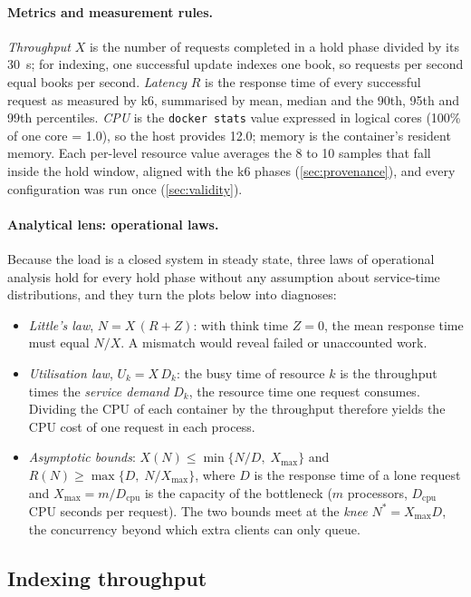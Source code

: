 \documentclass[10pt,a4paper]{article}
\newcommand{\code}[1]{\texttt{#1}}
\begin{document}
\paragraph{Metrics and measurement rules.}
\emph{Throughput} $X$ is the number of requests completed in a hold phase divided
by its 30~s; for indexing, one successful update indexes one book, so
requests per second equal books per second. \emph{Latency} $R$ is the response
time of every successful request as measured by k6, summarised by mean,
median and the 90th, 95th and 99th percentiles. \emph{CPU} is the
\code{docker stats} value expressed in logical cores (100\% of one core =
1.0), so the host provides 12.0; memory is the container's resident memory.
Each per-level resource value averages the 8 to 10 samples that fall inside the
hold window, aligned with the k6 phases (\cref{sec:provenance}), and every
configuration was run once (\cref{sec:validity}).

\paragraph{Analytical lens: operational laws.}
Because the load is a closed system in steady state, three laws of operational
analysis hold for every hold phase without any assumption about service-time
distributions, and they turn the plots below into diagnoses:
\begin{itemize}
  \item \emph{Little's law}, $N = X\,(R + Z)$: with think time $Z = 0$, the mean
  response time must equal $N/X$. A mismatch would reveal failed or
  unaccounted work.
  \item \emph{Utilisation law}, $U_k = X\,D_k$: the busy time of resource $k$
  is the throughput times the \emph{service demand} $D_k$, the resource time one
  request consumes. Dividing the CPU of each container by the throughput
  therefore yields the CPU cost of one request in each process.
  \item \emph{Asymptotic bounds}: $X(N) \le \min\{N/D,\; X_{\max}\}$ and
  $R(N) \ge \max\{D,\; N/X_{\max}\}$, where $D$ is the response time of a lone
  request and $X_{\max} = m / D_{\text{cpu}}$ is the capacity of the bottleneck
  ($m$ processors, $D_{\text{cpu}}$ CPU seconds per request). The two bounds meet at
  the \emph{knee} $N^{*} = X_{\max} D$, the concurrency beyond which extra
  clients can only queue.
\end{itemize}

\subsection{Indexing throughput}
\label{sec:bench-indexing}
\end{document}
